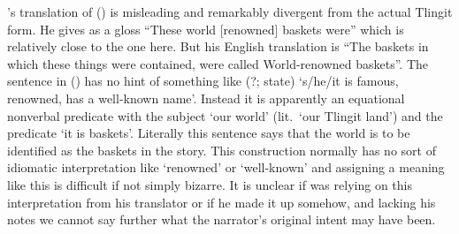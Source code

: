 \citeauthor{swanton:1909}’s translation of (\lastx) is misleading and remarkably divergent from the actual Tlingit form.
He gives as a gloss “These world [renowned] baskets were” which is relatively close to the one here.
But his English translation is “The baskets in which these things were contained, were called World-renowned baskets”.
The sentence in (\lastx) has no hint of something like  (?; state) ‘s/he/it is famous, renowned, has a well-known name’.
Instead it is apparently an equational nonverbal predicate with the subject  ‘our world’ (lit.\ ‘our Tlingit land’) and the predicate  ‘it is baskets’.
Literally this sentence says that the world is to be identified as the baskets in the story.
This construction normally has no sort of idiomatic interpretation like ‘renowned’ or ‘well-known’ and assigning a meaning like this is difficult if not simply bizarre.
It is unclear if \citeauthor{swanton:1909} was relying on this interpretation from his translator or if he made it up somehow, and lacking his notes we cannot say further what the narrator’s original intent may have been.

